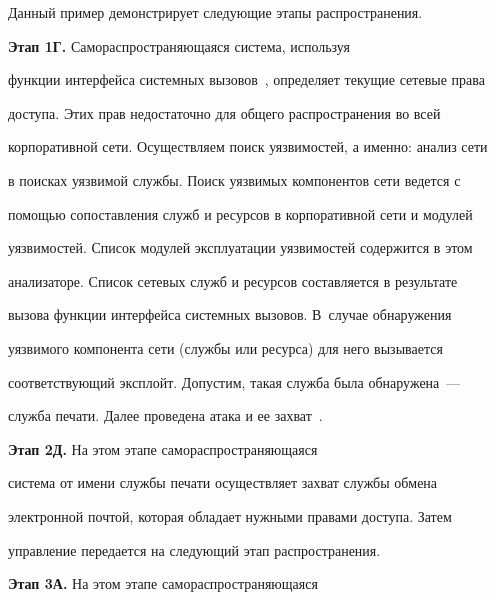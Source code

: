       Данный пример демонстрирует следующие этапы распространения.


      


\smallskip





   \textbf{Этап 1Г.} Самораспространяющаяся система, используя 


функции интерфейса системных вызовов~\cite{6-lev}, определяет текущие сетевые права 


доступа. Этих прав недостаточно для общего распространения во всей 


корпоративной сети. Осуществляем поиск уязвимостей, а именно: анализ сети 


в поисках уязвимой службы. Поиск уязвимых компонентов сети ведется с 


помощью сопоставления служб и ресурсов в корпоративной сети и модулей 


уязвимостей. Список модулей эксплуатации уязвимостей содержится в этом 


анализаторе. Список сетевых служб и ресурсов составляется в результате 


вызова функции интерфейса системных вызовов. В~случае обнаружения 


уязвимого компонента сети (службы или ресурса) для него вызывается 


соответствующий эксплойт. Допустим, такая служба была обнаружена~--- 


служба печати. Далее проведена атака и ее захват~\cite{5-lev, 3-lev}. 





\smallskip


   


   \textbf{Этап 2Д.} На этом этапе самораспространяющаяся 


система от имени службы печати осуществляет захват службы обмена 


электронной почтой, которая обладает нужными правами доступа. Затем 


управление передается на следующий этап распространения.





\smallskip


   


   \textbf{Этап 3А.} На этом этапе самораспространяющаяся 


